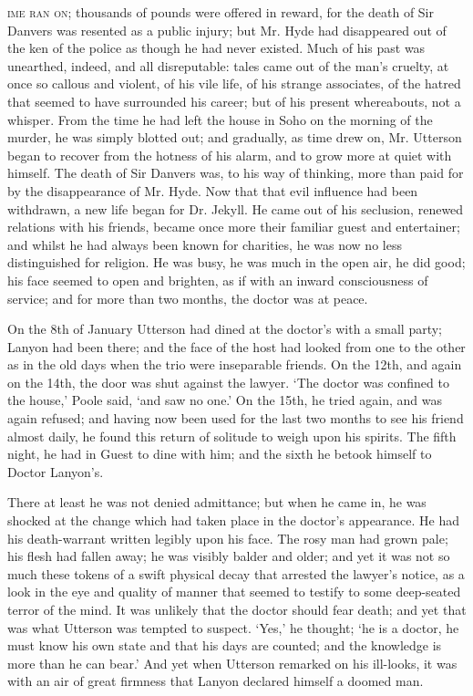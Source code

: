 \documentclass[]{novel}
\begin{document}
\textsc{ime ran on;} thousands of pounds were offered in reward, for the death of Sir Danvers was resented as a public injury; but Mr. Hyde had disappeared out of the ken of the police as though he had never existed. Much of his past was unearthed, indeed, and all disreputable: tales came out of the man’s cruelty, at once so callous and violent, of his vile life, of his strange associates, of the hatred that seemed to have surrounded his career; but of his present whereabouts, not a whisper. From the time he had left the house in Soho on the morning of the murder, he was simply blotted out; and gradually, as time drew on, Mr. Utterson began to recover from the hotness of his alarm, and to grow more at quiet with himself. The death of Sir Danvers was, to his way of thinking, more than paid for by the disappearance of Mr. Hyde. Now that that evil influence had been withdrawn, a new life began for Dr. Jekyll. He came out of his seclusion, renewed relations with his friends, became once more their familiar guest and entertainer; and whilst he had always been known for charities, he was now no less distinguished for religion. He was busy, he was much in the open air, he did good; his face seemed to open and brighten, as if with an inward consciousness of service; and for more than two months, the doctor was at peace.

On the 8th of January Utterson had dined at the doctor’s with a small party; Lanyon had been there; and the face of the host had looked from one to the other as in the old days when the trio were inseparable friends. On the 12th, and again on the 14th, the door was shut against the lawyer. ‘The doctor was confined to the house,’ Poole said, ‘and saw no one.’ On the 15th, he tried again, and was again refused; and having now been used for the last two months to see his friend almost daily, he found this return of solitude to weigh upon his spirits. The fifth night, he had in Guest to dine with him; and the sixth he betook himself to Doctor Lanyon’s.

There at least he was not denied admittance; but when he came in, he was shocked at the change which had taken place in the doctor’s appearance. He had his death-warrant written legibly upon his face. The rosy man had grown pale; his flesh had fallen away; he was visibly balder and older; and yet it was not so much these tokens of a swift physical decay that arrested the lawyer’s notice, as a look in the eye and quality of manner that seemed to testify to some deep-seated terror of the mind. It was unlikely that the doctor should fear death; and yet that was what Utterson was tempted to suspect. ‘Yes,’ he thought; ‘he is a doctor, he must know his own state and that his days are counted; and the knowledge is more than he can bear.’ And yet when Utterson remarked on his ill-looks, it was with an air of great firmness that Lanyon declared himself a doomed man.
\end{document}
